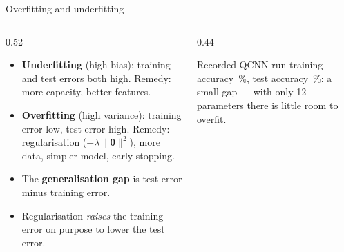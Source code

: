 \documentclass[aspectratio=169,11pt]{beamer}
\newcommand{\key}[1]{{\color{qdark}\textbf{#1}}}
\newcommand{\btheta}{\boldsymbol\theta}
\begin{document}
\begin{frame}[label=fFit]{Overfitting and underfitting}
  \begin{columns}[T]
    \begin{column}{0.52\textwidth}
      \small
      \begin{itemize}\itemsep2pt
        \item \key{Underfitting} (high bias): training and test errors both high. Remedy: more capacity, better features.
        \item \key{Overfitting} (high variance): training error low, test error high. Remedy: regularisation
          ($+\lambda\|\btheta\|^2$), more data, simpler model, early stopping.
        \item The \key{generalisation gap} is test error minus training error.
        \item Regularisation \emph{raises} the training error on purpose to lower the test error.
      \end{itemize}
    \end{column}
    \begin{column}{0.44\textwidth}
      \centering
      \begin{exampleblock}{Recorded QCNN run}
        \scriptsize training accuracy \numtrainacc\,\%, test accuracy \numtestacc\,\%: a small gap --- with only 12 parameters there is little room to overfit.
      \end{exampleblock}
    \end{column}
  \end{columns}
\end{frame}
\end{document}
